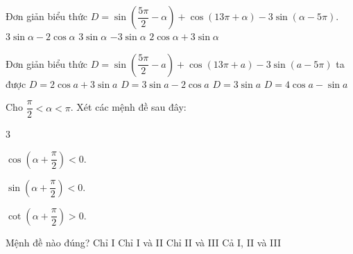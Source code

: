\begin{ex}%
	Đơn giản biểu  thức $ D=\sin\left(\dfrac{5\pi}{2}-\alpha\right)+\cos\left(13\pi+\alpha\right)-3\sin\left(\alpha-5\pi\right)$.
	\choice 
		{$ 3\sin\alpha-2\cos\alpha  $}
		{\True $ 3\sin\alpha $} 
		 {$-3\sin\alpha $}
		{$ 2\cos\alpha+3\sin\alpha $} 
\end{ex}

\begin{ex}%
	Đơn giản biểu thức $ D=\sin\left(\dfrac{5\pi}{2}-a\right)+\cos\left(13\pi+a\right)-3\sin\left(a-5\pi\right)$ ta  được
	\choice 
		{$D= 2\cos  a+3\sin a$}
		{$D= 3\sin  a-2\cos a$}
		{\True $D=3\sin a$} 
		{ $D= 4\cos  a-\sin a$}
\end{ex}

\begin{ex}%
	Cho $\dfrac{\pi}{2} < \alpha < \pi$. Xét các mệnh đề  sau đây:
	\begin{enumEX}[I.]{3}
		\item $\cos \left(\alpha+\dfrac{\pi}{2} \right) < 0$. 
		\item $\sin \left(\alpha+\dfrac{\pi}{2} \right) < 0$. 
		\item $\cot \left(\alpha+\dfrac{\pi}{2} \right)  > 0$.
	\end{enumEX}
	Mệnh đề nào đúng? 
	\choice 
		{Chỉ I} 
		 {Chỉ I và II}
		{Chỉ II  và III}
		{\True Cả I,  II và III}
\end{ex}


